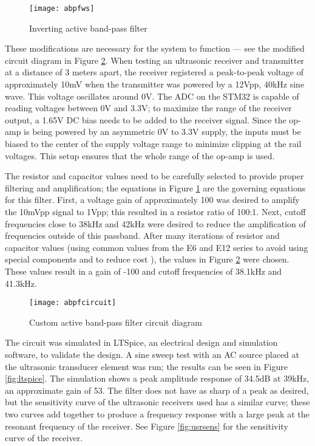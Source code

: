\documentclass[11pt]{ucthesisCP}
\begin{document}
\begin{figure}[htbp]
	\centering
	\texttt{[image: abpfws]}
	\caption{Inverting active band-pass filter \cite{abpfws}}
	\label{fig:abpfws}
\end{figure}

These modifications are necessary for the system to function --- see the modified circuit diagram in Figure \ref{fig:abpfcircuit}. When testing an ultrasonic receiver and transmitter at a distance of 3 meters apart, the receiver registered a peak-to-peak voltage of approximately 10mV when the transmitter was powered by a 12Vpp, 40kHz sine wave. This voltage oscillates around 0V. The ADC on the STM32 is capable of reading voltages between 0V and 3.3V; to maximize the range of the receiver output, a 1.65V DC bias needs to be added to the receiver signal. Since the op-amp is being powered by an asymmetric 0V to 3.3V supply, the inputs must be biased to the center of the supply voltage range to minimize clipping at the rail voltages. This setup ensures that the whole range of the op-amp is used.

The resistor and capacitor values need to be carefully selected to provide proper filtering and amplification; the equations in Figure \ref{fig:abpfws} are the governing equations for this filter. First, a voltage gain of approximately 100 was desired to amplify the 10mVpp signal to 1Vpp; this resulted in a resistor ratio of 100:1. Next, cutoff frequencies close to 38kHz and 42kHz were desired to reduce the amplification of frequencies outside of this passband. After many iterations of resistor and capacitor values (using common values from the E6 and E12 series to avoid using special components and to reduce cost \cite{e6e12}), the values in Figure \ref{fig:abpfcircuit} were chosen. These values result in a gain of -100 and cutoff frequencies of 38.1kHz and 41.3kHz. 

\begin{figure}[!htbp]
	\centering
	\texttt{[image: abpfcircuit]}
	\caption{Custom active band-pass filter circuit diagram}
	\label{fig:abpfcircuit}
\end{figure}

The circuit was simulated in LTSpice\textsuperscript{\textregistered}\xspace, an electrical design and simulation software, to validate the design. A sine sweep test with an AC source placed at the ultrasonic transducer element was run; the results can be seen in Figure \ref{fig:ltspice}. The simulation shows a peak amplitude response of 34.5dB at 39kHz, an approximate gain of 53. The filter does not have as sharp of a peak as desired, but the sensitivity curve of the ultrasonic receivers used has a similar curve; these two curves add together to produce a frequency response with a large peak at the resonant frequency of the receiver. See Figure \ref{fig:usrsens} for the sensitivity curve of the receiver.
\end{document}
